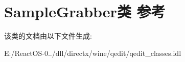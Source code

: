 \hypertarget{class_sample_grabber}{}\section{Sample\+Grabber类 参考}
\label{class_sample_grabber}


该类的文档由以下文件生成\+:\begin{DoxyCompactItemize}
\item 
E\+:/\+React\+O\+S-\/0../dll/directx/wine/qedit/qedit\+\_\+classes.\+idl\end{DoxyCompactItemize}
